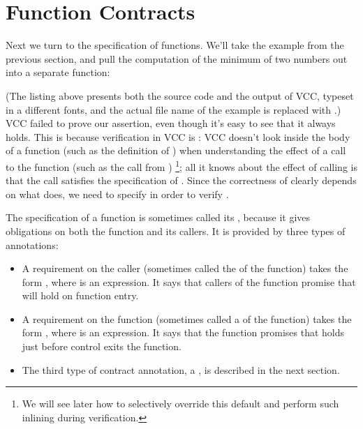 \section{Function Contracts}
\label{sect:functions}

Next we turn to the specification of functions. We'll take the example
from the previous section, and pull the computation of the minimum of
two numbers out into a separate function:


(The listing above presents both the source code and the output
of VCC, typeset in a different fonts, and 
the actual file name of the example is replaced with .)
VCC failed to prove our assertion, even though it's easy to see that
it always holds. This is because verification in VCC is : 
VCC doesn't look inside the body of a function (such as the definition of ) 
when understanding the effect of a call to the function (such as 
the call from )%
\footnote{We will see later how to selectively override this default
  and perform such inlining during verification.}; 
all it knows about the effect of calling  is that the call 
satisfies the specification of . 
Since the correctness of  clearly depends on what 
does, we need to specify  in order to verify .

The specification of a function is sometimes called its ,
because it gives obligations on both the function and its callers. It
is provided by three types of annotations:
\begin{itemize}
\item A requirement on the caller (sometimes called the
   of the function) takes the form , 
  where  is an expression. It says that callers of the
  function promise that  will hold on function entry. 

\item A requirement on the function (sometimes called a
   of the function) takes the form , 
  where  is an expression. It says that the function
  promises that  holds just before control exits the
  function. 

\item The third type of contract annotation, a , is described
  in the next section.
\end{itemize}

